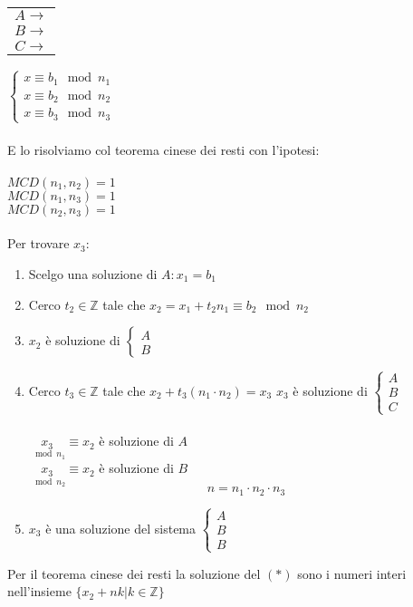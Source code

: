     \begin{tabular}{c}
        $A\longrightarrow$\\
        $B\longrightarrow$\\
        $C\longrightarrow$
    \end{tabular}
    $
    \begin{cases}
        x\equiv b_1\mod n_1\\
        x\equiv b_2\mod n_2\\
        x\equiv b_3\mod n_3
    \end{cases}
    $\\\\
    E lo risolviamo col teorema cinese dei resti con l'ipotesi:\\\\
    $MCD(n_1,n_2)=1$\\
    $MCD(n_1,n_3)=1$\\
    $MCD(n_2,n_3)=1$\\\\
    Per trovare $x_3$:
    \begin{enumerate}
        \item Scelgo una soluzione di $A: x_1=b_1$
        \item Cerco $t_2\in\mathbb{Z}$ tale che $x_2=x_1+t_2n_1
            \equiv b_2\mod n_2$
        \item $x_2$ è soluzione di $\begin{cases}A\\B\end{cases}$
        \item Cerco $t_3\in\mathbb{Z}$ tale che $x_2+t_3(n_1\cdot n_2)=x_3$
            $x_3$ è soluzione di 
            $
            \begin{cases}
                A\\B\\C
            \end{cases}
            $\\\\
            $\underset{\mod n_1}{x_3}\equiv x_2$ è soluzione di $A$\\
            $\underset{\mod n_2}{x_3}\equiv x_2$ è soluzione di $B$
            $$n=n_1\cdot n_2\cdot n_3$$
        \item $x_3$ è una soluzione del sistema $\begin{cases}A\\B\\B\end{cases}$
    \end{enumerate}
    Per il teorema cinese dei resti la soluzione del $(*)$ sono i numeri interi nell'insieme $\{x_2+nk|k\in\mathbb{Z}\}$

